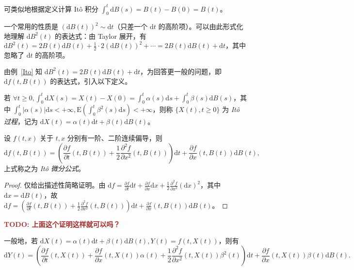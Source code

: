 \documentclass[../main.tex]{subfiles}
\begin{document}
可类似地根据定义计算 It\^o 积分 $\int_0^t\mathrm dB(s)=B(t)-B(0)=B(t)$。

一个常用的性质是 $(\mathrm dB(t))^2\sim\mathrm dt$（只差一个 $\mathrm dt$ 的高阶项）。可以由此形式化地理解 $\mathrm dB^2(t)$ 的表达式：由 Taylor 展开，有 $\mathrm dB^2(t)=2B(t)\mathrm dB(t)+\frac12\cdot2(\mathrm dB(t))^2+\cdots=2B(t)\mathrm dB(t)+\mathrm dt$，其中忽略了 $\mathrm dt$ 的高阶项。

由例~\ref{Ito} 知 $\mathrm dB^2(t)=2B(t)\mathrm dB(t)+\mathrm dt$，为回答更一般的问题，即 $\mathrm df(t,B(t))$ 的表达式，引入以下定义。

\begin{definition}\label{def:8.5.3}
    若 $\forall t\geq0,\int_0^t\mathrm dX(s)=X(t)-X(0)=\int_0^t\alpha(s)\mathrm ds+\int_0^t\beta(s)\mathrm dB(s)$，其中 $\int_0^t|\alpha(s)|\mathrm ds<+\infty,\mathrm E(\int_0^t\beta^2(s)\mathrm ds)<+\infty$，则称 $\{X(t),t\geq0\}$ 为 \emph{It\^o 过程}，记为 $\mathrm dX(t)=\alpha(t)\mathrm dt+\beta(t)\mathrm dB(t)$。
\end{definition}

\begin{theorem}\label{thm:8.5.1}
    设 $f(t,x)$ 关于 $t,x$ 分别有一阶、二阶连续偏导，则
    \begin{equation*}
        \mathrm df(t,B(t))=\left(\frac{\partial f}{\partial t}(t,B(t))+\frac12\frac{\partial^2f}{\partial x^2}(t,B(t))\right)\mathrm dt+\frac{\partial f}{\partial x}(t,B(t))\mathrm dB(t),
    \end{equation*}
    上式称之为 \emph{It\^o 微分公式}。
\end{theorem}

\begin{proof}
    仅给出描述性简略证明。由 $\mathrm df=\frac{\partial f}{\partial t}\mathrm dt+\frac{\partial f}{\partial x}\mathrm dx+\frac12\frac{\partial^2f}{\partial x^2}(\mathrm dx)^2$，其中 $\mathrm dx=\mathrm dB(t)$，故 $\mathrm df=\left(\frac{\partial f}{\partial t}(t,B(t))+\frac12\frac{\partial^2f}{\partial x^2}(t,B(t))\right)\mathrm dt+\frac{\partial f}{\partial x}(t,B(t))\mathrm dB(t)$。
\end{proof}

\textbf{\textcolor{brown}{TODO: 上面这个证明这样就可以吗？}}

一般地，若 $\mathrm dX(t)=\alpha(t)\mathrm dt+\beta(t)\mathrm dB(t),Y(t)=f(t,X(t))$，则有
\begin{equation*}
    \mathrm dY(t)=\left(\frac{\partial f}{\partial t}(t,X(t))+\frac{\partial f}{\partial x}(t,X(t))\alpha(t)+\frac12\frac{\partial^2f}{\partial x^2}(t,X(t))\beta^2(t)\right)\mathrm dt+\frac{\partial f}{\partial x}(t,X(t))\beta(t)\mathrm dB(t).
\end{equation*}
\end{document}
